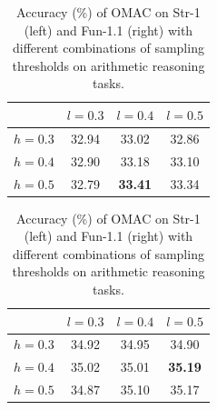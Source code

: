 

\begin{table}[th]\footnotesize
  \centering
    \captionsetup{width=0.9\textwidth}
    \caption{Accuracy (\%) of OMAC on Str-1 (left) and Fun-1.1 (right) with different combinations of sampling thresholds on arithmetic reasoning tasks.}
    \label{tab:sample_thre}


    \begin{minipage}[t]{0.45\textwidth}
    \centering
    \begin{tabular}{cccc}
      \toprule
      {} & $l=0.3$\scriptsize & $l=0.4$\scriptsize & $l=0.5$\scriptsize \\
      \midrule
    $h=0.3$
        & 32.94 & 33.02 & 32.86  \\
    $h=0.4$
        & 32.90 & {33.18} & 33.10  \\
    $h=0.5$
        & 32.79 & \textbf{33.41} & 33.34  \\
      \bottomrule
    \end{tabular}
    \end{minipage}
    \hspace{0.3cm}
    \begin{minipage}[t]{0.45\textwidth}
    \centering
    \begin{tabular}{cccc}
      \toprule
      {} & $l=0.3$\scriptsize & $l=0.4$\scriptsize & $l=0.5$\scriptsize \\
      \midrule
    $h=0.3$
        & 34.92 & {34.95} & 34.90  \\
    $h=0.4$
        & 35.02 & 35.01 & \textbf{35.19}  \\
    $h=0.5$
        & 34.87 & 35.10 & 35.17  \\
      \bottomrule
    \end{tabular}
    \end{minipage}
    

\end{table}